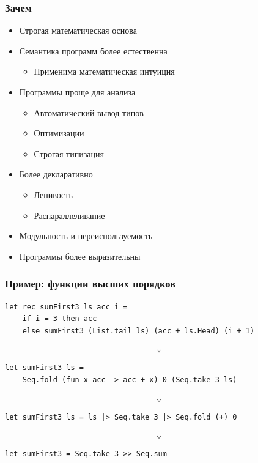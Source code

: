 \documentclass{../../slides-style}
\begin{document}
    \begin{frame}
        \frametitle{Зачем}
        \begin{itemize}
            \item Строгая математическая основа
            \item Семантика программ более естественна
            \begin{itemize}
                \item Применима математическая интуиция
            \end{itemize}
            \item Программы проще для анализа
            \begin{itemize}
                \item Автоматический вывод типов
                \item Оптимизации
                \item Строгая типизация
            \end{itemize}
            \item Более декларативно
            \begin{itemize}
                \item Ленивость
                \item Распараллеливание
            \end{itemize}
            \item Модульность и переиспользуемость
            \item Программы более выразительны
        \end{itemize}
    \end{frame}
    
    \begin{frame}[fragile]
        \frametitle{Пример: функции высших порядков}
        \begin{verbatim}
let rec sumFirst3 ls acc i =
    if i = 3 then acc 
    else sumFirst3 (List.tail ls) (acc + ls.Head) (i + 1)
        \end{verbatim}
        $$\Downarrow$$
        \begin{verbatim}
let sumFirst3 ls = 
    Seq.fold (fun x acc -> acc + x) 0 (Seq.take 3 ls)
        \end{verbatim}
        $$\Downarrow$$
        \begin{verbatim}
let sumFirst3 ls = ls |> Seq.take 3 |> Seq.fold (+) 0
        \end{verbatim}
        $$\Downarrow$$
        \begin{verbatim}
let sumFirst3 = Seq.take 3 >> Seq.sum
        \end{verbatim}
    \end{frame}
\end{document}

